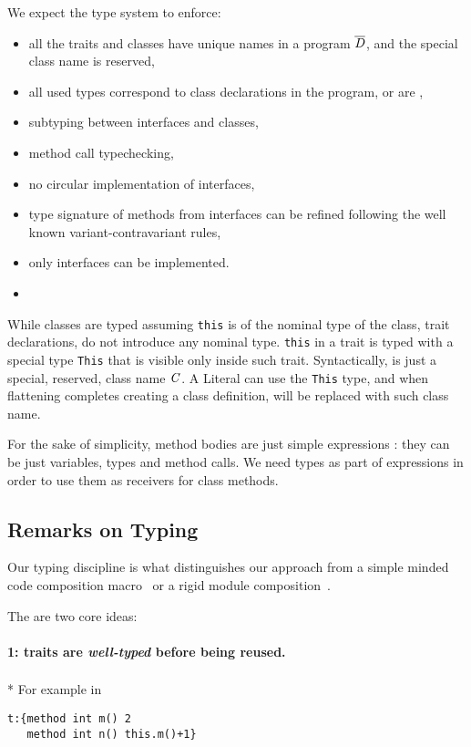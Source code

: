 We expect the type system to enforce: 
\begin{itemize}
\item all the traits and classes have unique names in a program $\overline{\mathit{D}}$, and the special class name
\Q@This@ is reserved,
\item all used types correspond to class declarations in the program, or are \Q@This@, 
\item subtyping between interfaces and classes,
\item method call typechecking,
\item no circular implementation of interfaces,
\item type signature of methods from interfaces can be refined following the well known variant-contravariant rules,
\item only interfaces can be implemented.
\item {}
\end{itemize}
While classes are typed assuming \lstinline{this} is of the nominal type of the
class, trait declarations, do not introduce any nominal type.  \lstinline{this}
in a trait is typed with a special type \lstinline{This} that is visible only
inside such trait. Syntactically, \Q@This@ is just a special, reserved, class name $\mathit{C}$.
A Literal can use the \lstinline{This} type,
and when flattening completes creating a class definition, \Q@This@ will be replaced with such class name.

For the sake of simplicity, method bodies are just simple expressions
\me: they can be just variables, types and method calls. We need types as part of expressions in order to use them as receivers for class methods.

\subsection{Remarks on Typing}
 Our typing discipline is 
what distinguishes our approach from a simple minded code composition macro~\cite{bawden1999quasiquotation}
or a rigid module composition~\cite{ancona2002calculus}.

The are two core ideas:
\paragraph{1: traits are \emph{well-typed} before being reused.}${}_{}$\\*
 For example in

\saveSpace\begin{lstlisting}
t:{method int m() 2 
   method int n() this.m()+1}
\end{lstlisting}\saveSpace

